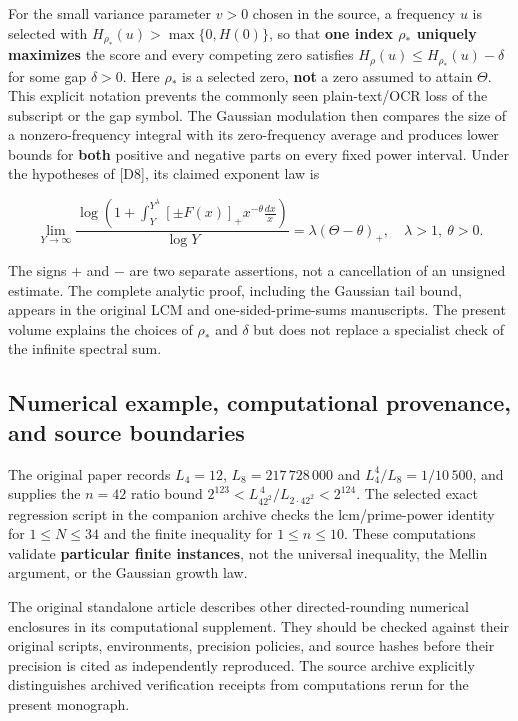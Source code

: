\documentclass[
  10pt,
  a4paper,
  10pt,
  oneside,
  openany]{book}
\begin{document}
For the small variance parameter \(v>0\) chosen in the source, a
frequency \(u\) is selected with \(H_{\rho_*}(u)>\max\{0,H(0)\}\), so
that \textbf{one index \(\rho_*\) uniquely maximizes} the score and
every competing zero satisfies \(H_\rho(u)\le H_{\rho_*}(u)-\delta\) for
some gap \(\delta>0\). Here \(\rho_*\) is a selected zero, \textbf{not}
a zero assumed to attain \(\Theta\). This explicit notation prevents the
commonly seen plain-text/OCR loss of the subscript or the gap symbol.
The Gaussian modulation then compares the size of a nonzero-frequency
integral with its zero-frequency average and produces lower bounds for
\textbf{both} positive and negative parts on every fixed power interval.
Under the hypotheses of {[}D8{]}, its claimed exponent law is

\[
\lim_{Y\to\infty}
\frac{\log\!\left(1+\int_Y^{Y^\lambda}[\pm F(x)]_+x^{-\theta}\frac{dx}{x}\right)}{\log Y}
=\lambda(\Theta-\theta)_+,
\quad \lambda>1,\ \theta>0.
\tag{S11.20}\label{eq:S11.20}
\]

The signs \(+\) and \(-\) are two separate assertions, not a
cancellation of an unsigned estimate. The complete analytic proof,
including the Gaussian tail bound, appears in the original LCM and
one-sided-prime-sums manuscripts. The present volume explains the
choices of \(\rho_*\) and \(\delta\) but does not replace a specialist
check of the infinite spectral sum.

\subsection{Numerical example, computational provenance, and source
boundaries}\label{numerical-example-computational-provenance-and-source-boundaries}

The original paper records \(L_4=12\), \(L_8=217\,728\,000\) and
\(L_4^4/L_8=1/10\,500\), and supplies the \(n=42\) ratio bound
\(2^{123}<L_{42^2}^{\,4}/L_{2\cdot42^2}<2^{124}\). The selected exact
regression script in the companion archive checks the lcm/prime-power
identity for \(1\le N\le34\) and the finite inequality for
\(1\le n\le10\). These computations validate \textbf{particular finite
instances}, not the universal inequality, the Mellin argument, or the
Gaussian growth law.

The original standalone article describes other directed-rounding
numerical enclosures in its computational supplement. They should be
checked against their original scripts, environments, precision
policies, and source hashes before their precision is cited as
independently reproduced. The source archive explicitly distinguishes
archived verification receipts from computations rerun for the present
monograph.
\end{document}
